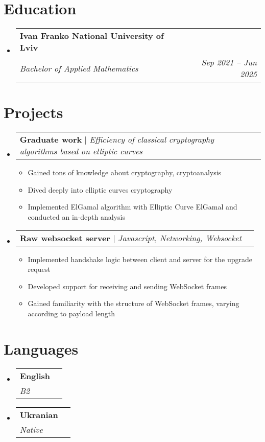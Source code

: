 \documentclass[letterpaper,11pt]{article}
\makeatletter
\newcommand{\resumeItem}[1]{
  \item\small{
    {#1 \vspace{-2pt}}
  }
}
\newcommand{\resumeSubheading}[4]{
  \vspace{-2pt}\item
    \begin{tabular*}{0.97\textwidth}[t]{l@{\extracolsep{\fill}}r}
      \textbf{#1} & #2 \\
      \textit{\small#3} & \textit{\small #4} \\
    \end{tabular*}\vspace{-7pt}
}
\newcommand{\resumeSubHeadingListStart}{\begin{itemize}[leftmargin=0.15in, label={}]}
\newcommand{\resumeSubHeadingListEnd}{\end{itemize}}
\newcommand{\resumeItemListStart}{\begin{itemize}}
\newcommand{\resumeItemListEnd}{\end{itemize}\vspace{-5pt}}
\newcommand{\resumeProjectHeading}[2]{
    \item
    \begin{tabular*}{0.97\textwidth}{l@{\extracolsep{\fill}}r}
      \small#1 & #2 \\
    \end{tabular*}\vspace{5pt}  %
}
\makeatother
\begin{document}
\section{Education}
  \resumeSubHeadingListStart
    \resumeSubheading
      {Ivan Franko National University of Lviv}{}
      {Bachelor of Applied Mathematics} {Sep 2021 -- Jun 2025}
  \resumeSubHeadingListEnd

\section{Projects}
    \resumeSubHeadingListStart
      \resumeProjectHeading
          {\textbf{Graduate work} $|$ \emph{Efficiency of classical cryptography algorithms based on elliptic curves}}{}
          \resumeItemListStart
            \resumeItem{Gained tons of knowledge about cryptography, cryptoanalysis}
            \resumeItem{Dived deeply into elliptic curves cryptography}
            \resumeItem{Implemented ElGamal algorithm with Elliptic Curve ElGamal and conducted an in-depth analysis}
          \resumeItemListEnd
      \resumeProjectHeading
          {\textbf{Raw websocket server} $|$ \emph{Javascript, Networking, Websocket}}{}
          \resumeItemListStart
            \resumeItem{Implemented handshake logic between client and server for the upgrade request}
            \resumeItem{Developed support for receiving and sending WebSocket frames}
            \resumeItem{Gained familiarity with the structure of WebSocket frames, varying according to payload length}
          \resumeItemListEnd
    \resumeSubHeadingListEnd
    
\section{Languages}
  \resumeSubHeadingListStart
    \resumeSubheading
      {English}{}
      {B2} {}
    \resumeSubheading
      {Ukranian}{}
      {Native} {}
  \resumeSubHeadingListEnd
  
\end{document}
